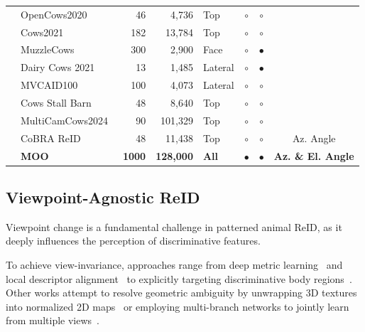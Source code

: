 \begin{table}[tbp]
\begin{tabular}{llrrlccc}
        & OpenCows2020~\cite{andrewVisualIdentificationIndividual2021a}
        & 46 & 4,736 & Top & $\circ$ & $\circ$ & \\

        & Cows2021~\cite{gaoSelfSupervisionVideoIdentification2021b}
        & 182 & 13,784 & Top & $\circ$ & $\circ$ & \\

        & MuzzleCows~\cite{shojaeipourAutomatedMuzzleDetection2021}
        & 300 & 2,900 & Face & $\circ$ & $\bullet$ & \\

        & Dairy Cows 2021~\cite{liIndividualDairyCow2021}
        & 13 & 1,485 & Lateral & $\circ$ & $\bullet$ & \\

        & MVCAID100~\cite{zhaoCompactLossVisual2022}
        & 100 & 4,073 & Lateral & $\circ$ & $\circ$ & \\

        & Cows Stall Barn~\cite{xiaoCowIdentificationFreestall2022b}
        & 48 & 8,640 & Top & $\circ$ & $\circ$ & \\

        & MultiCamCows2024~\cite{yuMultiCamCows2024MultiviewImage2024}
        & 90 & 101,329 & Top & $\circ$ & $\circ$ & \\

        & CoBRA ReID~\cite{perneelDynamicMultiBehaviourOrientationInvariant2025}
        & 48 & 11,438 & Top & $\circ$ & $\circ$ & Az. Angle \\

        & \textbf{MOO}
        & \textbf{1000} & \textbf{128,000} & \textbf{All} & $\bullet$ & $\bullet$ & \textbf{Az. \& El. Angle} \\

        \bottomrule
    \end{tabular}
\end{table}

\subsection{Viewpoint-Agnostic ReID}
\label{subsec:viewpoint-agnostic-reid}
Viewpoint change is a fundamental challenge in patterned animal ReID, as it deeply influences the perception of discriminative features.

To achieve view-invariance, approaches range from deep metric learning~\cite{zhaoCompactLossVisual2022, zhaoMultiCenterAgentLoss2022} and local descriptor alignment~\cite{chenHolsteinCattleFace2022b} to explicitly targeting discriminative body regions~\cite{shojaeipourAutomatedMuzzleDetection2021, nepovinnykhReidentificationPatternedAnimals2025c, phyoHybridRollingSkew2018, dacLivestockIdentificationUsing2022, nepovinnykhSpeciesAgnosticPatternedAnimal2024}.
Other works attempt to resolve geometric ambiguity by unwrapping 3D textures into normalized 2D maps~\cite{hiby2009tiger, algasovUnsupervisedPelagePattern2025} or employing multi-branch networks to jointly learn from multiple views~\cite{bergaminiMultiviewsEmbeddingCattle2018a, li2024cattle}.


